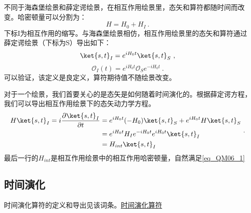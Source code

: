 \begin{definition}{}

不同于海森堡绘景和薛定谔绘景，在相互作用绘景里，态矢和算符都随时间而改变。哈密顿量可以分割为：
\begin{equation}
H=H_0+H_I~.
\end{equation}
下标I为相互作用的缩写。与海森堡绘景相仿，相互作用绘景里的态矢和算符通过薛定谔绘景（下标为S）导出如下：
\begin{equation}
\ket{s,t}_I=e^{iH_0 t}\ket{s,t}_S~,
\end{equation}
\begin{equation}\label{eq_QM06_1}
\mathcal O_I(t)=e^{iH_0 t}\mathcal O_Se^{-iH_0 t}~.
\end{equation}
可以验证，该定义是良定义，算符期待值不随绘景改变。
\end{definition}
对于一个绘景，我们首要关心的是态矢是如何随着时间演化的。根据薛定谔方程，我们可以导出相互作用绘景下的态矢动力学方程。
\begin{equation}
\begin{aligned}
H\ket{s,t}_I=i\frac{\partial\ket{s,t}_I}{\partial t}&= e^{iH_0 t}(-H_0)\ket{s,t}_S+e^{iH_0 t}H\ket{s,t}_S\\
&=e^{iH_0 t}H_Ie^{-iH_0 t}e^{iH_0 t}\ket{s,t}_I\\
&=H_{int}\ket{s,t}_I
\end{aligned}~.
\end{equation}
最后一行的$H_{int}$是相互作用绘景中的相互作用哈密顿量，自然满足\autoref{eq_QM06_1} 
\subsection{时间演化}
时间演化算符的定义和导出见该词条。\href{https://wuli.wiki/online/TOprt.html}{时间演化算符}


